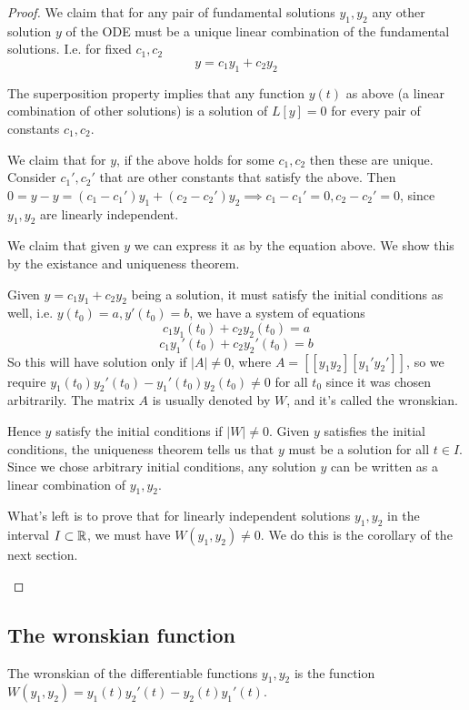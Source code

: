 \begin{proof}
  We claim that for any pair of fundamental solutions $y_1, y_2$ any other solution $y$ of
  the ODE must be a unique linear combination of the fundamental solutions. I.e. for fixed
  $c_1,c_2$
  \[y = c_1 y_1 + c_2 y_2\]
  \begin{itemize}
      \ii The superposition property implies that any function $y(t)$ as above (a linear
      combination of other solutions) is a solution of $L[y]=0$ for every pair of
      constants $c_1,c_2$.

      \ii We claim that for $y$, if the above holds for some $c_1,c_2$ then these are
      unique. Consider $c_1', c_2'$ that are other constants that satisfy the above. Then
      $0=y-y=(c_1-c_1') y_1 + (c_2-c_2') y_2 \implies c_1-c_1'=0, c_2-c_2'=0$, since
      $y_1,y_2$ are linearly independent.

      \ii We claim that given $y$ we can express it as by the equation above. We show this
      by the existance and uniqueness theorem.
      
      Given $y=c_1y_1 + c_2y_2$ being a solution, it must satisfy the initial conditions
      as well, i.e. $y(t_0)=a, y'(t_0) = b$, we have a system of equations
      \[ c_1 y_1(t_0) + c_2 y_2(t_0) = a\]
      \[ c_1 y_1'(t_0) + c_2 y_2'(t_0) = b\]
      So this will have solution only if $|A|\neq 0$, where $A=[ [ y_1 y_2] [y_1' y_2']]$,
      so we require $y_1(t_0) y_2'(t_0) - y_1'(t_0) y_2(t_0) \neq 0$ for all $t_0$ since
      it was chosen arbitrarily. The matrix $A$ is usually denoted by $W$, and it's called
      the wronskian.

      Hence $y$ satisfy the initial conditions if $|W|\neq 0$. Given $y$ satisfies the
      initial conditions, the uniqueness theorem tells us that $y$ must be a solution for
      all $t\in I$. Since we chose arbitrary initial conditions, any solution $y$ can be
      written as a linear combination of $y_1, y_2$.

      What's left is to prove that for linearly independent solutions $y_1,y_2$ in the
      interval $I\subset \mathbb R$, we must have $W(y_1, y_2)\neq 0$. We do this is the
      corollary of the next section.
  \end{itemize}
\end{proof}

\subsection{The wronskian function}
\begin{definition}
  The wronskian of the differentiable functions $y_1,y_2$ is the function $W(y_1,y_2) =
  y_1(t) y_2'(t) - y_2(t) y_1'(t)$.
\end{definition}

